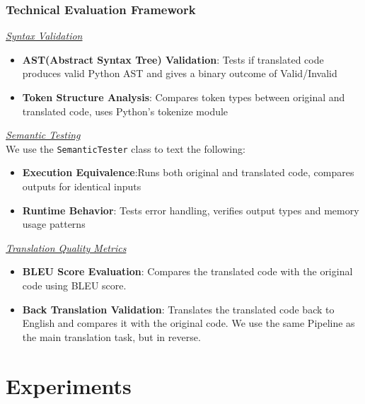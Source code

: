 \documentclass[11pt,a4paper]{article}
\begin{document}
\subsubsection{Technical Evaluation Framework}
\textit{\underline{Syntax Validation}}
\begin{itemize}[itemsep=0pt, topsep=0pt]
    \item \textbf{AST(Abstract Syntax Tree) Validation}: Tests if translated code produces valid Python AST and gives a binary outcome of Valid/Invalid
    \item \textbf{Token Structure Analysis}: Compares token types between original and translated code, uses Python's tokenize module
\end{itemize}
\textit{\underline{Semantic Testing}}\\We use the \texttt{SemanticTester} class to text the following:
\begin{itemize}[itemsep=0pt, topsep=0pt]
    \item \textbf{Execution Equivalence}:Runs both original and translated code, compares outputs for identical inputs
    \item \textbf{Runtime Behavior}: Tests error handling, verifies output types and memory usage patterns
\end{itemize}
\textit{\underline{Translation Quality Metrics}}
\begin{itemize}
  \item \textbf{BLEU Score Evaluation}: Compares the translated code with the original code using BLEU score.
  \item \textbf{Back Translation Validation}: Translates the translated code back to English and compares it with the original code. We use the same Pipeline as the main translation task, but in reverse.
\end{itemize}
\section{Experiments}
\end{document}
